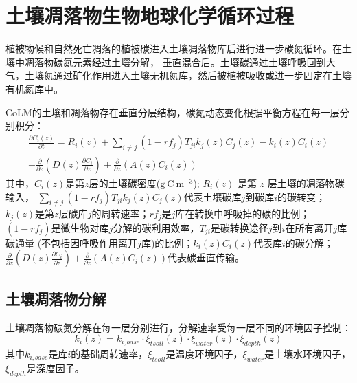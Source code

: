 \chapter{土壤凋落物生物地球化学循环过程}\label{土壤凋落物生物地球化学循环过程}

植被物候和自然死亡凋落的植被碳进入土壤凋落物库后进行进一步碳氮循环。在土壤中凋落物碳氮元素经过土壤分解，
垂直混合后。土壤碳通过土壤呼吸回到大气，土壤氮通过矿化作用进入土壤无机氮库，然后被植被吸收或进一步固定在土壤有机氮库中。

CoLM的土壤和凋落物存在垂直分层结构，碳氮动态变化根据平衡方程在每一层分别积分：
\begin{equation}
\begin{array}{r}\frac{\partial C_{i}(z)}{\partial t}=R_{i}(z)+\sum_{i \neq j}\left(1-r f_{j}\right) T_{j i} k_{j}(z) C_{j}(z)-k_{i}(z) C_{i}(z) \\ +\frac{\partial}{\partial z}\left(D(z) \frac{\partial C_{i}}{\partial z}\right)+\frac{\partial}{\partial z}\left(A(z) C_{i}(z)\right)\end{array}
\end{equation}
其中，$C_i\left(z\right)$是第$z$层的土壤碳密度($\mathrm{g\ C\ m^{-3}}$); $R_i (z)$ 是第 $z$ 层土壤的凋落物碳输入，
$\sum_{i\neq j}{\left(1-{rf}_j\right)T_{ji}k_j\left(z\right)C_j\left(z\right)}$代表土壤碳库$j$到碳库$i$的碳转变；
$k_j\left(z\right)$是第$z$层碳库$j$的周转速率；${rf}_j$是$j$库在转换中呼吸掉的碳的比例；
$\left(1-{rf}_j\right)$是微生物对库$j$分解的碳利用效率，$T_{ji}$是碳转换途径$j$到$i$在所有离开$j$库碳通量
(不包括因呼吸作用离开$j$库)的比例；$k_i\left(z\right)C_i\left(z\right)$代表库$i$的碳分解；
$\frac{\partial}{\partial z}\left(D\left(z\right)\frac{\partial C_i}{\partial z}\right)+\frac{\partial}{\partial z}\left(A\left(z\right)C_i\left(z\right)\right)$代表碳垂直传输。

\section{土壤凋落物分解}\label{土壤凋落物分解}
土壤凋落物碳氮分解在每一层分别进行，分解速率受每一层不同的环境因子控制：
\begin{equation}
k_{i}(z)=k_{i,base} \cdot \xi_{tsoil}(z) \cdot \xi_{water}(z) \cdot \xi_{depth}(z)
\end{equation}
其中$k_{i,base}$是库$i$的基础周转速率，$\xi_{tsoil}$是温度环境因子，$\xi_{water}$是土壤水环境因子，$\xi_{depth}$是深度因子。

